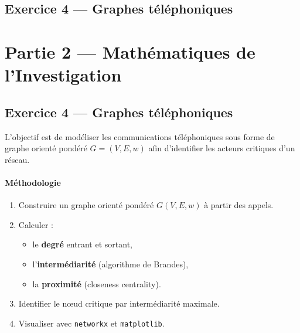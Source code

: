 \documentclass[11pt]{article}
\begin{document}
\subsection{Exercice 4 — Graphes téléphoniques}

\section{Partie 2 — Mathématiques de l’Investigation}

\subsection{Exercice 4 — Graphes téléphoniques}

L’objectif est de modéliser les communications téléphoniques sous forme de graphe orienté pondéré $G=(V,E,w)$ afin d’identifier les acteurs critiques d’un réseau.

\paragraph{Méthodologie}
\begin{enumerate}
  \item Construire un graphe orienté pondéré $G(V,E,w)$ à partir des appels.
  \item Calculer :
    \begin{itemize}
      \item le \textbf{degré} entrant et sortant,
      \item l’\textbf{intermédiarité} (algorithme de Brandes),
      \item la \textbf{proximité} (closeness centrality).
    \end{itemize}
  \item Identifier le nœud critique par intermédiarité maximale.
  \item Visualiser avec \texttt{networkx} et \texttt{matplotlib}.
\end{enumerate}
\end{document}
